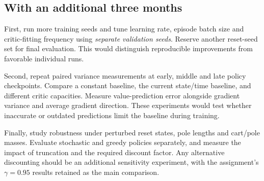 \documentclass[11pt,letterpaper]{article}
\begin{document}
\subsection{With an additional three months}
First, run more training seeds and tune learning rate, episode batch size and critic-fitting frequency using \emph{separate validation seeds}. Reserve another reset-seed set for final evaluation. This would distinguish reproducible improvements from favorable individual runs.

Second, repeat paired variance measurements at early, middle and late policy checkpoints. Compare a constant baseline, the current state/time baseline, and different critic capacities. Measure value-prediction error alongside gradient variance and average gradient direction. These experiments would test whether inaccurate or outdated predictions limit the baseline during training.

Finally, study robustness under perturbed reset states, pole lengths and cart/pole masses. Evaluate stochastic and greedy policies separately, and measure the impact of truncation and the required discount factor. Any alternative discounting should be an additional sensitivity experiment, with the assignment's $\gamma=0.95$ results retained as the main comparison.
\end{document}
